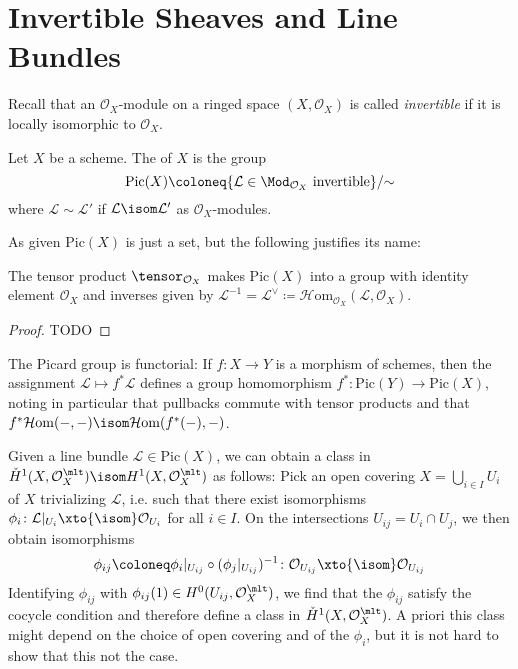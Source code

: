 \documentclass[wip, algebra]{bsteffan-lecturenotes}
\newcommand{\cO}{\mathcal{O}}
\newcommand{\cL}{\mathcal{L}}
\newcommand{\Pic}{\mathrm{Pic}}
\newcommand{\sHom}{\mathcal{H}\mathrm{om}}
\begin{document}
\section{Invertible Sheaves and Line Bundles}
Recall that an $\cO_X$-module on a ringed space $(X, \cO_X)$ is called \emph{invertible} if it is locally isomorphic to $\cO_X$.
\begin{definition}
	Let $X$ be a scheme.
	The  of $X$ is the group
	\begin{equation*}
		\Pic(X) \coloneq \{\cL \in \Mod_{\cO_X} \text{ invertible}\} / {{\sim}}
	\end{equation*}
	where $\cL \sim \cL'$ if $\cL \isom \cL'$ as $\cO_X$-modules.
\end{definition}
As given $\Pic(X)$ is just a set, but the following justifies its name:
\begin{proposition}
	The tensor product $\tensor_{\cO_X}$ makes $\Pic(X)$ into a group with identity element $\cO_X$ and inverses given by $\cL^{-1} = \cL^\vee \coloneq \sHom_{\cO_X}(\cL, \cO_X)$.
\end{proposition}
\begin{proof}
	TODO
\end{proof}
\begin{remark}
	The Picard group is functorial:
	If $f\colon X \to Y$ is a morphism of schemes, then the assignment $\cL \mapsto f^* \cL$ defines a group homomorphism $f^*\colon \Pic(Y) \to \Pic(X)$, noting in particular that pullbacks commute with tensor products and that $f^*\sHom({{-}}, {{-}}) \isom \sHom(f^*({{-}}), {{-}})$.
\end{remark}
Given a line bundle $\cL \in \Pic(X)$, we can obtain a class in $\check{H}^1(X, \cO_X^\mlt) \isom H^1(X, \cO_X^\mlt)$ as follows: 
Pick an open covering $X = \bigcup_{i \in I} U_i$ of $X$ trivializing $\cL$, i.e. such that there exist isomorphisms $\phi_i\colon \cL|_{U_i} \xto{\isom} \cO_{U_i}$ for all $i \in I$.
On the intersections $U_{ij} = U_i \cap U_j$, we then obtain isomorphisms 
\begin{equation*}
	\phi_{ij} \coloneq \phi_i|_{U_{ij}} \circ (\phi_j|_{U_{ij}})^{-1}\colon \cO_{U_{ij}} \xto{\isom} \cO_{U_{ij}}
\end{equation*}
Identifying $\phi_{ij}$ with $\phi_{ij}(1) \in H^0(U_{ij}, \cO^\mlt_X)$, we find that the $\phi_{ij}$ satisfy the cocycle condition and therefore define a class in $\check{H}^1(X, \cO^\mlt_X)$.
A priori this class might depend on the choice of open covering and of the $\phi_i$, but it is not hard to show that this not the case.
\end{document}
